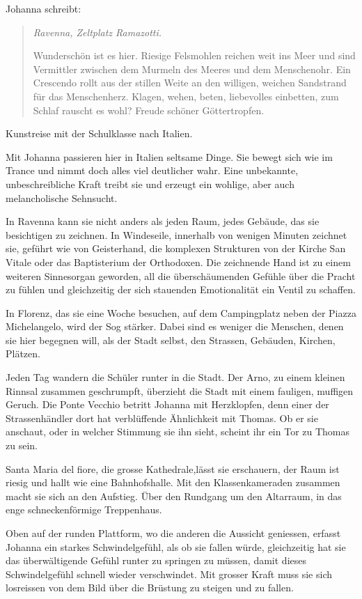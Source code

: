\documentclass[10pt,titlepage,a5paper]{book}
\newenvironment{tg}{\begin{quote}\em}{\end{quote}}
\begin{document}
	
	

Johanna schreibt:


\begin{tg}
Ravenna, Zeltplatz Ramazotti.

Wunderschön ist es hier. Riesige Felsmohlen reichen weit ins Meer und sind Vermittler zwischen dem Murmeln des Meeres und dem Menschenohr. Ein Crescendo rollt aus der stillen Weite an den willigen, weichen Sandstrand für das Menschenherz. Klagen, wehen, beten, liebevolles einbetten, zum Schlaf rauscht es wohl? Freude schöner Göttertropfen.
\end{tg}


Kunstreise mit der Schulklasse nach Italien.

Mit Johanna passieren hier in Italien seltsame Dinge. Sie bewegt sich wie im Trance und nimmt doch alles viel deutlicher wahr. Eine unbekannte, unbeschreibliche Kraft treibt sie und erzeugt ein wohlige, aber auch melancholische Sehnsucht.

In Ravenna kann sie nicht anders als jeden Raum, jedes Gebäude, das sie besichtigen zu zeichnen. In Windeseile, innerhalb von wenigen Minuten zeichnet sie, geführt wie von Geisterhand, die komplexen Strukturen von der Kirche San Vitale oder das Baptisterium der Orthodoxen. Die zeichnende Hand ist zu einem weiteren Sinnesorgan geworden, all die überschäumenden Gefühle über die Pracht zu fühlen und gleichzeitig der sich stauenden Emotionalität  ein Ventil zu schaffen.

In Florenz, das sie eine Woche besuchen, auf dem Campingplatz neben der Piazza Michelangelo, wird der Sog stärker. Dabei sind es weniger die Menschen, denen sie hier begegnen will, als der Stadt selbst, den Strassen, Gebäuden, Kirchen, Plätzen.

Jeden Tag wandern die Schüler runter in die Stadt. Der Arno, zu einem kleinen Rinnsal zusammen geschrumpft,  überzieht die Stadt mit einem fauligen, muffigen Geruch. Die Ponte Vecchio betritt Johanna mit Herzklopfen, denn einer der Strassenhändler dort hat verblüffende Ähnlichkeit mit Thomas. Ob er sie anschaut, oder in welcher Stimmung sie ihn sieht, scheint ihr ein Tor zu Thomas zu sein.

Santa Maria del fiore, die grosse Kathedrale,lässt sie erschauern, der Raum ist riesig und hallt wie eine Bahnhofshalle. Mit den Klassenkameraden zusammen macht sie sich an den Aufstieg. Über den Rundgang um den Altarraum, in das enge schneckenförmige Treppenhaus. 

Oben auf der runden Plattform, wo die anderen die Aussicht geniessen, erfasst Johanna ein starkes Schwindelgefühl, als ob sie fallen würde, gleichzeitig hat sie das überwältigende Gefühl runter zu springen zu müssen, damit dieses Schwindelgefühl schnell wieder verschwindet. Mit grosser Kraft muss sie sich losreissen von dem Bild über die Brüstung zu steigen und zu fallen. 
\end{document}
